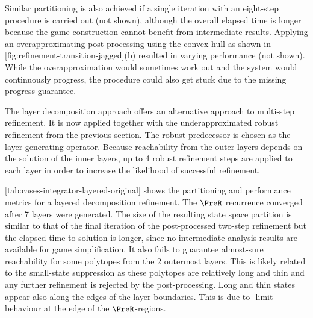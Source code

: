     Similar partitioning is also achieved if a single iteration with an eight-step procedure is carried out (not shown), although the overall elapsed time is longer because the game construction cannot benefit from intermediate results.
    Applying an overapproximating post-processing using the convex hull as shown in [fig:refinement-transition-jagged](b) resulted in varying performance (not shown).
    While the overapproximation would sometimes work out and the system would continuously progress, the procedure could also get stuck due to the missing progress guarantee.

\stopsubsection


\startsubsection[title={Positive Robust Refinement with Layer Decomposition},reference=sec:cases-integrator-layered]


    The layer decomposition approach offers an alternative approach to multi-step refinement.
    It is now applied together with the underapproximated robust refinement from the previous section.
    The robust predecessor is chosen as the layer generating operator.
    Because reachability from the outer layers depends on the solution of the inner layers, up to 4 robust refinement steps are applied to each layer in order to increase the likelihood of successful refinement.

    [tab:cases-integrator-layered-original] shows the partitioning and performance metrics for a layered decomposition refinement.
    The $\PreR$ recurrence converged after 7 layers were generated.
    The size of the resulting state space partition is similar to that of the final iteration of the post-processed two-step refinement but the elapsed time to solution is longer, since no intermediate analysis results are available for game simplification.
    It also fails to guarantee almost-sure reachability for some polytopes from the 2 outermost layers.
    This is likely related to the small-state suppression as these polytopes are relatively long and thin and any further refinement is rejected by the post-processing.
    Long and thin states appear also along the edges of the layer boundaries.
    This is due to \epsilon-limit behaviour at the edge of the $\PreR$-regions.

